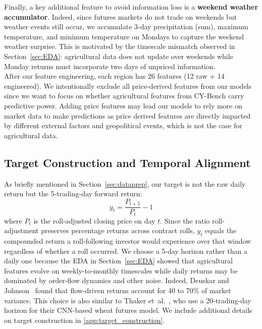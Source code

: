 \documentclass[pdflatex,sn-mathphys-num, oneside, 11pt]{sn-jnl}%
\theoremstyle{thmstyleone}%
\theoremstyle{thmstyletwo}%
\theoremstyle{thmstylethree}%
\begin{document}
Finally, a key additional feature to avoid information loss is a \textbf{weekend weather accumulator}. Indeed, since futures markets do not trade on weekends but weather events still occur, we accumulate 3-day precipitation (sum), maximum temperature, and minimum temperature on Mondays to capture the weekend weather surprise. This is motivated by the timescale mismatch observed in Section~\ref{sec:EDA}: agricultural data does not update over weekends while Monday returns must incorporate two days of unpriced information.\\

After our feature engineering, each region has 26 features (12 raw + 14 engineered). We intentionally exclude all price-derived features from our models since we want to focus on whether agricultural features from CY-Bench carry predictive power. Adding price features may lead our models to rely more on market data to make predictions as price derived features are directly impacted by different external factors and geopolitical events, which is not the case for agricultural data.

\subsection{Target Construction and Temporal Alignment}

As briefly mentioned in Section~\ref{sec:dataprep}, our target is not the raw daily return but the 5-trading-day forward return:
\begin{equation}
    y_{t} = \frac{P_{t+5}}{P_t} - 1
\end{equation}
where $P_t$ is the roll-adjusted closing price on day $t$. Since the ratio roll-adjustment preserves percentage returns across contract rolls, $y_t$ equals the compounded return a roll-following investor would experience over that window regardless of whether a roll occurred. We choose a 5-day horizon rather than a daily one because the EDA in Section~\ref{sec:EDA} showed that agricultural features evolve on weekly-to-monthly timescales while daily returns may be dominated by order-flow dynamics and other noise. Indeed, Deuskar and Johnson~\cite{bib85} found that flow-driven returns account for 40 to 70\% of market variance. This choice is also similar to Thaker et~al.~\cite{bib19}, who use a 20-trading-day horizon for their CNN-based wheat futures model. We include additional details on target construction in \autoref{app:target_construction}.\\
\end{document}
